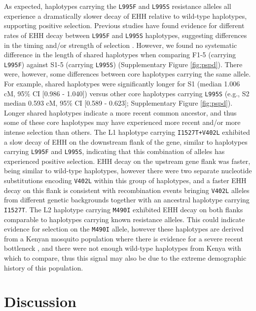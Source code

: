 \documentclass[a4paper,11pt,abstracton,hidelinks]{scrartcl}
\begin{document}
%
As expected, haplotypes carrying the \texttt{L995F} and \texttt{L995S} resistance alleles all experience a dramatically slower decay of EHH relative to wild-type haplotypes, supporting positive selection.
%
Previous studies have found evidence for different rates of EHH decay between \texttt{L995F} and \texttt{L995S} haplotypes,
suggesting differences in the timing and/or strength of selection \cite{Lynd2010}.
%
However, we found no systematic difference in the length of shared haplotypes when comparing F1-5 (carrying \texttt{L995F}) against S1-5 (carrying \texttt{L995S}) (Supplementary Figure \ref{fig:pspd}).
%
There were, however, some differences between core haplotypes carrying the same allele.
%
For example, shared haplotypes were significantly longer for S1 (median 1.006 cM, 95\% CI [0.986 - 1.040]) versus other core haplotypes carrying \texttt{L995S} (e.g., S2 median 0.593 cM, 95\% CI [0.589 - 0.623]; Supplementary Figure \ref{fig:pspd}).
%
Longer shared haplotypes indicate a more recent common ancestor, and thus some of these core haplotypes may have experienced more recent and/or more intense selection than others.
%
The L1 haplotype carrying \texttt{I1527T+V402L} exhibited a slow decay of EHH on the downstream flank of the gene, similar to haplotypes carrying \texttt{L995F} and \texttt{L995S}, indicating that this combination of alleles has experienced positive selection.
%
EHH decay on the upstream gene flank was faster, being similar to wild-type haplotypes, however there were two separate nucleotide substitutions encoding \texttt{V402L} within this group of haplotypes, and a faster EHH decay on this flank is consistent with recombination events bringing \texttt{V402L} alleles from different genetic backgrounds together with an ancestral haplotype carrying \texttt{I1527T}.
%
The L2 haplotype carrying \texttt{M490I} exhibited EHH decay on both flanks comparable to haplotypes carrying known resistance alleles.
%
This could indicate evidence for selection on the \texttt{M490I} allele, however these haplotypes are derived from a Kenyan mosquito population where there is evidence for a severe recent bottleneck \cite{Ag1000gConsortium2017}, and there were not enough wild-type haplotypes from Kenya with which to compare, thus this signal may also be due to the extreme demographic history of this population.


\section*{Discussion}
\end{document}
